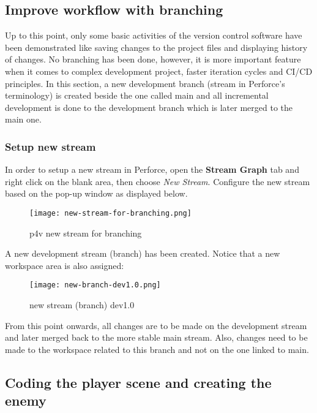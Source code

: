 \subsection{Improve workflow with branching}
Up to this point, only some basic activities of the version control software have been
demonstrated like saving changes to the project files and displaying history of changes. No branching
has been done, however, it is more important feature when it comes to complex development project, faster iteration cycles and
CI/CD principles. In this section, a new development branch (stream in Perforce's terminology) is created beside the one
called main and all incremental development is done to the development branch which is later merged to the main one.
\subsubsection{Setup new stream}
In order to setup a new stream in Perforce, open the \textbf{Stream Graph} tab and right click on the blank area, then choose
\textit{New Stream}. Configure the new stream based on the pop-up window as displayed below.
\begin{figure}[H]
    \centering
    \texttt{[image: new-stream-for-branching.png]}
    \caption{p4v new stream for branching}
    \label{fig:new-stream-for-branching}
\end{figure}
A new development stream (branch) has been created. Notice that a new workspace area is also assigned:
\begin{figure}[H]
    \centering
    \texttt{[image: new-branch-dev1.0.png]}
    \caption{new stream (branch) dev1.0}
    \label{fig:new-branch-dev1.0}
\end{figure}
From this point onwards, all changes are to be made on the development stream and later merged back to the more stable
main stream. Also, changes need to be made to the workspace related to this branch and not on the one linked to main.

\subsection{Coding the player scene and creating the enemy}
